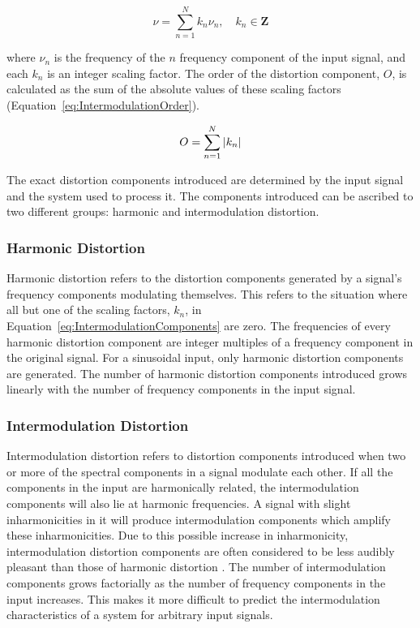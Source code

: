 		\begin{equation}
			\nu = \sum_{n = 1}^{N} k_{n}\nu_{n}, \quad k_{n} \in \textbf{Z}
			\label{eq:IntermodulationComponents}
		\end{equation}

		where $\nu_{n}$ is the frequency of the $n$ frequency component of the input signal, and each
		$k_{n}$ is an integer scaling factor. The order of the distortion component, $O$, is calculated as the sum
		of the absolute values of these scaling factors (Equation~\ref{eq:IntermodulationOrder}).

		\begin{equation}
			O = \sum_{n = 1}^{N} \left|k_{n}\right|
			\label{eq:IntermodulationOrder}
		\end{equation}

		The exact distortion components introduced are determined by the input signal and the system used to
		process it. The components introduced can be ascribed to two different groups: harmonic and intermodulation
		distortion.

		\subsubsection*{Harmonic Distortion}
			Harmonic distortion refers to the distortion components generated by a signal's frequency
			components modulating themselves. This refers to the situation where all but one of the scaling
			factors, $k_{n}$, in Equation~\ref{eq:IntermodulationComponents} are zero. The frequencies of every
			harmonic distortion component are integer multiples of a frequency component in the original
			signal. For a sinusoidal input, only harmonic distortion components are generated. The number of
			harmonic distortion components introduced grows linearly with the number of frequency components in
			the input signal.

		\subsubsection*{Intermodulation Distortion}
			Intermodulation distortion refers to distortion components introduced when two or more of the
			spectral components in a signal modulate each other. If all the components in the input are
			harmonically related, the intermodulation components will also lie at harmonic frequencies. A
			signal with slight inharmonicities in it will produce intermodulation components which amplify
			these inharmonicities. Due to this possible increase in inharmonicity, intermodulation distortion
			components are often considered to be less audibly pleasant than those of harmonic distortion
			\citep{rumsey2009sound}. The number of intermodulation components grows factorially as the number
			of frequency components in the input increases. This makes it more difficult to predict the
			intermodulation characteristics of a system for arbitrary input signals.

